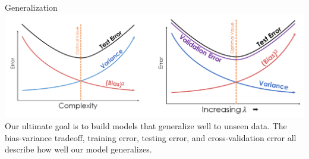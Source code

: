 \documentclass[aspectratio=169]{../latex_main/tntbeamer}  %
\begin{document}
	
	
	\begin{frame}{Generalization}
	    \includegraphics[scale=.4]{Bild10}\\
	    Our ultimate goal is to build models that generalize well to unseen data. The bias-variance tradeoff, training error, testing error, and cross-validation error all describe how well our model generalizes.

	\end{frame}
	
	
	
\end{document}
